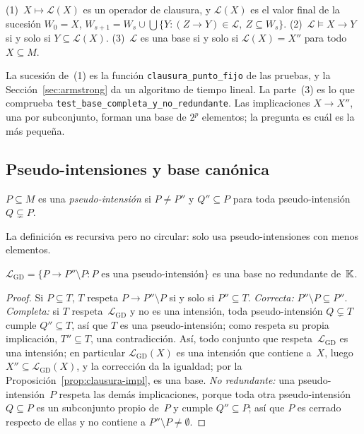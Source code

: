 \begin{proposicion}\label{prop:clausura-impl}
(1)~$X \mapsto \mathcal{L}(X)$ es un operador de clausura, y $\mathcal{L}(X)$ es el valor final de la sucesión $W_0 = X$, $W_{s+1} = W_s \cup \bigcup \{ Y : (Z \to Y) \in \mathcal{L},\ Z \subseteq W_s \}$. (2)~$\mathcal{L} \models X \to Y$ si y solo si $Y \subseteq \mathcal{L}(X)$. (3)~$\mathcal{L}$ es una base si y solo si $\mathcal{L}(X) = X''$ para todo $X \subseteq M$.
\end{proposicion}

La sucesión de~(1) es la función \texttt{clausura\_punto\_fijo} de las pruebas, y la Sección~\ref{sec:armstrong} da un algoritmo de tiempo lineal. La parte~(3) es lo que comprueba \texttt{test\_base\_completa\_y\_no\_redundante}. Las implicaciones $X \to X''$, una por subconjunto, forman una base de $2^p$ elementos; la pregunta es cuál es la más pequeña.


\subsection{Pseudo-intensiones y base canónica}
\label{sec:base-canonica}

\begin{definicion}\label{def:pseudo}
$P \subseteq M$ es una \emph{pseudo-intensión} si $P \ne P''$ y $Q'' \subseteq P$ para toda pseudo-intensión $Q \subsetneq P$.
\end{definicion}

La definición es recursiva pero no circular: solo usa pseudo-intensiones con menos elementos.

\begin{teorema}\label{teo:gd}
$\mathcal{L}_{\mathrm{GD}} = \{ P \to P'' \setminus P : P \text{ es una pseudo-intensión} \}$ es una base no redundante de~$\mathbb{K}$.
\end{teorema}

\begin{proof}
Si $P \subseteq T$, $T$ respeta $P \to P'' \setminus P$ si y solo si $P'' \subseteq T$. \emph{Correcta:} $P'' \setminus P \subseteq P''$. \emph{Completa:} si $T$ respeta~$\mathcal{L}_{\mathrm{GD}}$ y no es una intensión, toda pseudo-intensión $Q \subsetneq T$ cumple $Q'' \subseteq T$, así que $T$ es una pseudo-intensión; como respeta su propia implicación, $T'' \subseteq T$, una contradicción. Así, todo conjunto que respeta~$\mathcal{L}_{\mathrm{GD}}$ es una intensión; en particular $\mathcal{L}_{\mathrm{GD}}(X)$ es una intensión que contiene a~$X$, luego $X'' \subseteq \mathcal{L}_{\mathrm{GD}}(X)$, y la corrección da la igualdad; por la Proposición~\ref{prop:clausura-impl}, es una base. \emph{No redundante:} una pseudo-intensión~$P$ respeta las demás implicaciones, porque toda otra pseudo-intensión $Q \subseteq P$ es un subconjunto propio de~$P$ y cumple $Q'' \subseteq P$; así que $P$ es cerrado respecto de ellas y no contiene a $P'' \setminus P \neq \emptyset$.
\end{proof}

